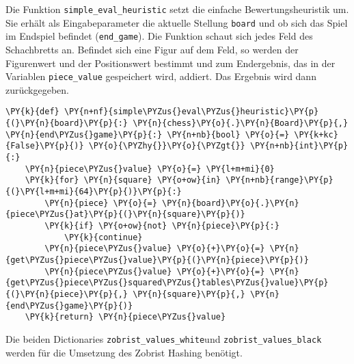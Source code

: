     Die Funktion \texttt{simple\_eval\_heuristic} setzt die einfache
Bewertungsheuristik um. Sie erhält als Eingabeparameter die aktuelle
Stellung \texttt{board} und ob sich das Spiel im Endspiel befindet
(\texttt{end\_game}). Die Funktion schaut sich jedes Feld des
Schachbretts an. Befindet sich eine Figur auf dem Feld, so werden der
Figurenwert und der Positionswert bestimmt und zum Endergebnis, das in
der Variablen \texttt{piece\_value} gespeichert wird, addiert. Das
Ergebnis wird dann zurückgegeben.

\bigskip

    \begin{tcolorbox}[fontupper=\linespread{.66}\selectfont, breakable, size=fbox, boxrule=1pt, pad at break*=1mm,colback=cellbackground, colframe=cellborder]
\begin{Verbatim}[commandchars=\\\{\}]
\PY{k}{def} \PY{n+nf}{simple\PYZus{}eval\PYZus{}heuristic}\PY{p}{(}\PY{n}{board}\PY{p}{:} \PY{n}{chess}\PY{o}{.}\PY{n}{Board}\PY{p}{,} \PY{n}{end\PYZus{}game}\PY{p}{:} \PY{n+nb}{bool} \PY{o}{=} \PY{k+kc}{False}\PY{p}{)} \PY{o}{\PYZhy{}}\PY{o}{\PYZgt{}} \PY{n+nb}{int}\PY{p}{:}
    \PY{n}{piece\PYZus{}value} \PY{o}{=} \PY{l+m+mi}{0}
    \PY{k}{for} \PY{n}{square} \PY{o+ow}{in} \PY{n+nb}{range}\PY{p}{(}\PY{l+m+mi}{64}\PY{p}{)}\PY{p}{:}
        \PY{n}{piece} \PY{o}{=} \PY{n}{board}\PY{o}{.}\PY{n}{piece\PYZus{}at}\PY{p}{(}\PY{n}{square}\PY{p}{)}
        \PY{k}{if} \PY{o+ow}{not} \PY{n}{piece}\PY{p}{:}
            \PY{k}{continue}
        \PY{n}{piece\PYZus{}value} \PY{o}{+}\PY{o}{=} \PY{n}{get\PYZus{}piece\PYZus{}value}\PY{p}{(}\PY{n}{piece}\PY{p}{)}
        \PY{n}{piece\PYZus{}value} \PY{o}{+}\PY{o}{=} \PY{n}{get\PYZus{}piece\PYZus{}squared\PYZus{}tables\PYZus{}value}\PY{p}{(}\PY{n}{piece}\PY{p}{,} \PY{n}{square}\PY{p}{,} \PY{n}{end\PYZus{}game}\PY{p}{)}
    \PY{k}{return} \PY{n}{piece\PYZus{}value}
\end{Verbatim}
\end{tcolorbox}

    Die beiden Dictionaries \texttt{zobrist\_values\_white}und
\texttt{zobrist\_values\_black} werden für die Umsetzung des Zobrist
Hashing benötigt.

\bigskip

